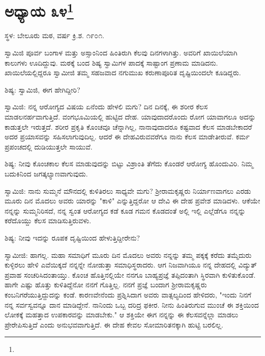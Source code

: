 \newpage

\chapter[ಅಧ್ಯಾಯ ೩೪]{ಅಧ್ಯಾಯ ೩೪\protect\footnote{}}

\begin{center}
ಸ್ಥಳ: ಬೇಲೂರು ಮಠ, ವರ್ಷ ಕ್ರಿ.ಶ. ೧೯೦೧.
\end{center}

ಸ್ವಾಮಿಜಿ ಪೂರ್ವ ಬಂಗಾಳ ಮತ್ತು ಅಸ್ಸಾಂನಿಂದ ಹಿಂತಿರುಗಿ ಕೆಲವು ದಿನಗಳಾಗಿತ್ತು. ಅವರಿಗೆ ಖಾಯಿಲೆಯಾಗಿ ಕಾಲುಗಳು ಊದಿದ್ದುವು. ಮಠಕ್ಕೆ ಬಂದ ಶಿಷ್ಯ ಸ್ವಾಮಿಗಳ ಪಾದಕ್ಕೆ ಸಾಷ್ಟಾಂಗ ಪ್ರಣಾಮ ಮಾಡಿದನು. ಖಾಯಿಲೆಯಲ್ಲಿದ್ದರೂ ಸ್ವಾಮೀಜಿ ತಮ್ಮ ಸಹಜವಾದ ನಗುಮುಖ ಕರುಣಾಪೂರಿತ ದೃಷ್ಟಿಯಿಂದಲೇ ಕೂಡಿದ್ದರು.

ಶಿಷ್ಯ: ಸ್ವಾಮಿಜಿ, ಈಗ ಹೇಗಿದ್ದೀರಿ?

ಸ್ವಾಮಿಜಿ: ನನ್ನ ಆರೋಗ್ಯದ ವಿಷಯ ಏನೆಂದು ಹೇಳಲಿ ಮಗು? ದಿನ ದಿನಕ್ಕೆ, ಈ ಶರೀರ ಕೆಲಸ ಮಾಡಲನರ್ಹವಾಗುತ್ತಿದೆ. ವಂಗಭೂಮಿಯಲ್ಲಿ ಹುಟ್ಟಿದ ದೇಹ. ಯಾವುದಾದರೊಂದು ರೋಗ ಯಾವಾಗಲೂ ಅದನ್ನು ಕಾಡುತ್ತಲೇ ಇರುತ್ತದೆ. ಶರೀರ ಪ್ರಕೃತಿ ಕೊಂಚವೂ ಚೆನ್ನಾಗಿಲ್ಲ, ನಾನಾವುದಾದರೂ ಕಷ್ಟವಾದ ಕೆಲಸ ಮಾಡಬೇಕಾದರೆ ಅದರ ಪ್ರಯಾಸವನ್ನು ಸಹಿಸಲಾಗುವುದಿಲ್ಲ. ಆದರೆ ಈ ದೇಹವಿರುವವರೆಗೂ ನಾನು ಕೆಲಸ ಮಾಡೇತೀರುವೆ. ಕರ್ಮ ಪ್ರಪಂಚದಲ್ಲಿ ದುಡಿಯುತ್ತಲೇ ಸಾಯುವೆ.

ಶಿಷ್ಯ: ನೀವು ಕೊಂಚಕಾಲ ಕೆಲಸ ಮಾಡುವುದನ್ನು ಬಿಟ್ಟು ವಿಶ್ರಾಂತಿ ತೆಗೆದು ಕೊಂಡರೆ ಆರೋಗ್ಯ ಹೊಂದುವಿರಿ. ನಿಮ್ಮ ಬದುಕಿನಿಂದ ಜಗತ್ಕಲ್ಯಾಣವಾಗುವುದು.

ಸ್ವಾಮಿಜಿ: ನಾನು ಸುಮ್ಮನೆ ಮೌನದಲ್ಲಿ ಕುಳಿತಿರಲು ಸಾಧ್ಯವೇ ಮಗು? ಶ‍್ರೀರಾಮಕೃಷ್ಣರು ನಿರ್ಯಾಣವಾಗಲು ಎರಡು ಮೂರು ದಿನ ಮೊದಲು ಅವರು ಯಾರನ್ನು "ಕಾಳಿ" ಎನ್ನುತ್ತಿದ್ದರೋ ಆ ದೇವಿ ಈ ದೇಹ ಪ್ರವೇಶ ಮಾಡಿದಳು. ಆಕೆಯೇ ನನ್ನನ್ನು ಸುಮ್ಮನಿರಿಸದೆ, ನನ್ನ ಸ್ವಂತ ಆರೋಗ್ಯದ ಕಡೆ ಕೂಡ ಗಮನ ಕೊಡದಂತೆ ಅಲ್ಲಿ ಇಲ್ಲಿ ಎಲ್ಲೆಡೆಗೂ ನನ್ನನ್ನು ಕರೆದೊಯ್ದು ಕೆಲಸ ಮಾಡಿಸುತ್ತಿರುವಳು.

ಶಿಷ್ಯ: ನೀವು ಇದನ್ನು ರೂಪಕ ದೃಷ್ಟಿಯಿಂದ ಹೇಳುತ್ತಿದ್ದೀರೇನು?

ಸ್ವಾಮೀಜಿ: ಹಾಗಲ್ಲ. ಮಹಾ ಸಮಾಧಿಗೆ ಮೂರು ದಿನ ಮೊದಲು ಅವರು ನನ್ನನ್ನು ತಮ್ಮ ಪಕ್ಕಕ್ಕೆ ಕರೆದು ತಮ್ಮೆದುರು ಕುಳ್ಳಿರಲು ಹೇಳಿ ಎವೆಯಿಕ್ಕದೆ ನನ್ನನ್ನೇ ನೋಡುತ್ತಾ ಸಮಾಧಿಸ್ಥರಾದರು. ಆಗ ನಿಜವಾಗಿಯೂ ನನ್ನ ದೇಹದಲ್ಲಿ ವಿದ್ಯುತ್ ಪ್ರವಾಹ ಸಂಚರಿಸಿದಂತಾಯ್ತು. ಕೊಂಚ ಹೊತ್ತಿನಲ್ಲಿಯೇ ನನಗೂ ಬಾಹ್ಯಪ್ರಜ್ಞೆ ತಪ್ಪಿದಂತಾಗಿ ಸ್ಥಿರವಾಗಿ ಕುಳಿತುಕೊಂಡೆ. ಹಾಗೇ ಎಷ್ಟು ಹೊತ್ತು ಕುಳಿತಿದ್ದೆನೋ ನನಗೆ ಗೊತ್ತಿಲ್ಲ. ನನಗೆ ಪ್ರಜ್ಞೆ ಬಂದಾಗ ಶ‍್ರೀರಾಮಕೃಷ್ಣರು ಕಂಬನಿಗರೆಯುತ್ತಿದ್ದುದನ್ನು ಕಂಡೆ. ಕಾರಣವೇನೆಂದು ಪ್ರಶ್ನಿಸಿದಾಗ ಅವರು ವಾತ್ಸಲ್ಯದಿಂದ ಹೇಳಿದರು, "ಇಂದು ನಿನಗೆ ನನ್ನ ಸರ್ವಸ್ವವನ್ನೂ ದಾನ ಮಾಡಿದ್ದೇನೆ. ನಾನಿಂದು ಒಬ್ಬ ದರಿದ್ರ ಫಕೀರ. ನೀನು ಹಿಂತಿರುಗುವ ಮುಂಚೆ ಈ ಶಕ್ತಿಯಿಂದ ಲೋಕಕ್ಕೆ ಮಹತ್ತಾದ ಉಪಕಾರವನ್ನು ಮಾಡಬೇಕು." ಆ ಶಕ್ತಿಯೇ ಈಗ ನನ್ನನ್ನು ಈ ಕೆಲಸವನ್ನೆಲ್ಲಾ ಮಾಡಲು ಪ್ರೇರೇಪಿಸುತ್ತಿದೆ ಎಂದು ಅನುಭವವಾಗುತ್ತಿದೆ. ಈ ದೇಹ ಕೇವಲ ಸೋಮಾರಿತನಕ್ಕಾಗಿ ಹುಟ್ಟಿ ಬರಲಿಲ್ಲ.

